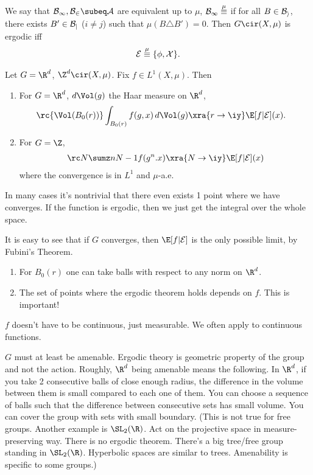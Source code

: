 We say that $\cal B_1,\cal  B_2\subeq \cal A$ are equivalent up to $\mu$, $\cal B_1\stackrel{\mu}{\equiv}$ if for all $B\in \cal B_i$, there exists $B'\in \cal B_j$ ($i\ne j$) such that $\mu(B\triangle B')=0$. Then $G\cir (X,\mu)$ is ergodic iff
\begin{align}
\cal E \stackrel{\mu}{\equiv} \{\phi,X\}.
\end{align}
\begin{thm}
Let $G=\R^d$, $\Z^d\cir (X,\mu)$. Fix $f\in L^1(X,\mu)$. Then 
\begin{enumerate}
\item
For $G=\R^d$, $d\Vol(g)$ the Haar measure on $\R^d$,
\begin{align}
\rc{\Vol(B_0(r))} \int_{B_0(r)} 
f(g,x) \,d\Vol(g)
&\xra{r\to \iy} \E[f|\cal E](x). 
\end{align}
\item
For $G=\Z$, 
\begin{align}
\rc N \sumz n{N-1} f(g^n.x) \xra{N\to \iy} \E[f|\cal E](x)
\end{align}
where the convergence is in $L^1$ and $\mu$-a.e.
\end{enumerate}
\end{thm}
In many cases it's nontrivial that there even exists 1 point where we have converges. If the function is ergodic, then we just get the integral over the whole space. 

It is easy to see that if $G$ converges, then $\E[f|\cal E]$ is the only possible limit, by Fubini's Theorem.

\begin{rem}
\begin{enumerate}
\item
For $B_0(r)$ one can take balls with respect to any norm on $\R^d$. 
\item
The set of points where the ergodic theorem holds depends on $f$.  This is important!
\end{enumerate}
\end{rem}
$f$ doesn't have to be continuous, just measurable. We often apply to continuous functions.

$G$ must at least be amenable. Ergodic theory is geometric property of the group and not the action. Roughly, $\R^d$ being amenable means the following. In $\R^d$, if you take 2 consecutive balls of close enough radius, the difference in the volume between them is small compared to each one of them. You can choose a sequence of balls such that the difference between consecutive sets has small volume. You can cover the group with sets with small boundary. (This is not true for free groups. Another example is $\SL_2(\R)$. Act on the projective space in measure-preserving way. There is no ergodic theorem. There's a big tree/free group standing in $\SL_2(\R)$. Hyperbolic spaces are similar to trees. Amenability is specific to some groups.)

